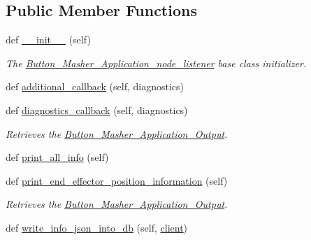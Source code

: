 \subsection*{Public Member Functions}
\begin{DoxyCompactItemize}
\item 
def \hyperlink{classButton__Masher__Application__Output_1_1Button__Masher__Application__node__listener_ae64f0875afe3067b97ba370b354b9213}{\+\_\+\+\_\+init\+\_\+\+\_\+} (self)
\begin{DoxyCompactList}\small\item\em The \hyperlink{classButton__Masher__Application__Output_1_1Button__Masher__Application__node__listener}{Button\+\_\+\+Masher\+\_\+\+Application\+\_\+node\+\_\+listener} base class initializer. \end{DoxyCompactList}\item 
def \hyperlink{classButton__Masher__Application__Output_1_1Button__Masher__Application__node__listener_ab35c2e69050a4f7d87cf90a41f087211}{additional\+\_\+callback} (self, diagnostics)
\item 
def \hyperlink{classButton__Masher__Application__Output_1_1Button__Masher__Application__node__listener_ab3b9e5b2975cf90154645eee1c579708}{diagnostics\+\_\+callback} (self, diagnostics)
\begin{DoxyCompactList}\small\item\em Retrieves the \hyperlink{namespaceButton__Masher__Application__Output}{Button\+\_\+\+Masher\+\_\+\+Application\+\_\+\+Output}. \end{DoxyCompactList}\item 
def \hyperlink{classButton__Masher__Application__Output_1_1Button__Masher__Application__node__listener_a04fc3ce521383ebf5abcc970f6d403b3}{print\+\_\+all\+\_\+info} (self)
\item 
def \hyperlink{classButton__Masher__Application__Output_1_1Button__Masher__Application__node__listener_a123cdc0332063476801ee93d615ea911}{print\+\_\+end\+\_\+effector\+\_\+position\+\_\+information} (self)
\begin{DoxyCompactList}\small\item\em Retrieves the \hyperlink{namespaceButton__Masher__Application__Output}{Button\+\_\+\+Masher\+\_\+\+Application\+\_\+\+Output}. \end{DoxyCompactList}\item 
def \hyperlink{classButton__Masher__Application__Output_1_1Button__Masher__Application__node__listener_a0897f4dea41dd51e61ea2d7a6eaf44c7}{write\+\_\+info\+\_\+json\+\_\+into\+\_\+db} (self, \hyperlink{classButton__Masher__Application__Output_1_1Button__Masher__Application__node__listener_ad5bc32b75da65fe60067f501a4bb6665}{client})

\end{DoxyCompactItemize}
